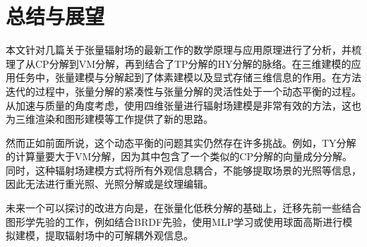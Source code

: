 \documentclass[10pt,twocolumn,letterpaper]{article}
\begin{document}
\section{总结与展望}
\label{sec:conclusion}
本文针对几篇关于张量辐射场的最新工作的数学原理与应用原理进行了分析，并梳理了从CP分解到VM分解，再到结合了TP分解的HY分解的脉络。在三维建模的应用任务中，张量建模与分解起到了体素建模以及显式存储三维信息的作用。在方法迭代的过程中，张量分解的紧凑性与张量分解的灵活性处于一个动态平衡的过程。从加速与质量的角度考虑，使用四维张量进行辐射场建模是非常有效的方法，这也为三维渲染和图形建模等工作提供了新的思路。

然而正如前面所说，这个动态平衡的问题其实仍然存在许多挑战。例如，TY分解的计算量要大于VM分解，因为其中包含了一个类似的CP分解的向量成分分解。同时，这种辐射场建模方式将所有外观信息耦合，不能够提取场景的光照等信息，因此无法进行重光照、光照分解或是纹理编辑。

未来一个可以探讨的改进方向是，在张量化低秩分解的基础上，迁移先前一些结合图形学先验的工作，例如结合BRDF先验，使用MLP学习或使用球面高斯进行模拟建模，提取辐射场中的可解耦外观信息。

{\small


}
\end{document}
